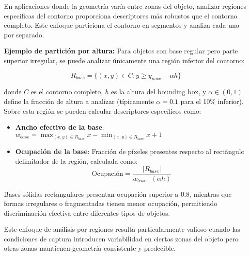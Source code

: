 En aplicaciones donde la geometría varía entre zonas del objeto, analizar regiones específicas del contorno proporciona descriptores más robustos que el contorno completo. Este enfoque particiona el contorno en segmentos y analiza cada uno por separado.

\textbf{Ejemplo de partición por altura:} Para objetos con base regular pero parte superior irregular, se puede analizar únicamente una región inferior del contorno:

\begin{equation}
R_{base} = \{(x,y) \in C : y \geq y_{max} - \alpha h\}
\end{equation}

donde $C$ es el contorno completo, $h$ es la altura del bounding box, y $\alpha \in (0,1)$ define la fracción de altura a analizar (típicamente $\alpha = 0.1$ para el 10\% inferior). Sobre esta región se pueden calcular descriptores específicos como:

\begin{itemize}
\item \textbf{Ancho efectivo de la base}: $w_{base} = \max_{(x,y) \in R_{base}} x - \min_{(x,y) \in R_{base}} x + 1$

\item \textbf{Ocupación de la base}: Fracción de píxeles presentes respecto al rectángulo delimitador de la región, calculada como:
\begin{equation}
\text{Ocupación} = \frac{|R_{base}|}{w_{base} \cdot (\alpha h)}
\end{equation}
\end{itemize}

Bases sólidas rectangulares presentan ocupación superior a 0.8, mientras que formas irregulares o fragmentadas tienen menor ocupación, permitiendo discriminación efectiva entre diferentes tipos de objetos.

Este enfoque de análisis por regiones resulta particularmente valioso cuando las condiciones de captura introducen variabilidad en ciertas zonas del objeto pero otras zonas mantienen geometría consistente y predecible.
